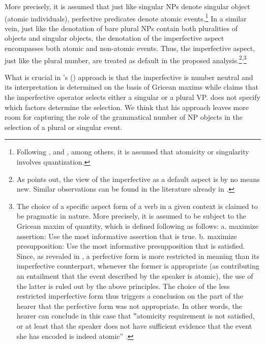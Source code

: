 \documentclass[output=paper]{langscibook}
\begin{document}
\noindent More precisely, it is assumed that just like singular NPs denote singular object (atomic individuals), perfective predicates denote atomic events.\footnote{Following \citet{Krifka1992}, \citet{Filip2000} and \citet{Rothstein2004}, among others, it is assumed that atomicity or singularity involves quantization.} In a similar vein, just like the denotation of bare plural NPs contain both pluralities of objects and singular objects, the denotation of the imperfective aspect encompasses both atomic and non-atomic events. Thus, the imperfective aspect, just like the plural number, are treated as default in the proposed analysis.\footnote{As \citet{Kagan2010} points out, the view of the imperfective as a default aspect is by no means new. Similar observations can be found in the literature already in  \citet{Forsyth1970}.}\textsuperscript{,}\footnote{The choice of a specific aspect form of a verb in a given context is claimed to be pragmatic in nature. More precisely, it is assumed to be subject to the Gricean maxim of quantity, which \citet{Kagan2008, Kagan2010} is defined following \citet{Sauerland2003b} as follows:	a.	maximize assertion: Use the most informative assertion that is true. b.	maximize presupposition: Use the most informative presupposition that is satisfied.   
Since, as revealed in , a perfective form is more restricted in meaning than its imperfective counterpart, whenever the former is appropriate (as contributing an entailment that the event described by the speaker is atomic), the use of the latter is ruled out by the above principles. The choice of the less restricted imperfective form thus triggers a conclusion on the part of the hearer that the perfective form was not appropriate. In other words, the hearer can conclude in this case that ‟atomicity requirement is not satisfied, or at least that the speaker does not have sufficient evidence that the event she has encoded is indeed atomic” \citep[10--12]{Kagan2008}.}
 
What is crucial in \citeauthor{Kagan2008}'s (\citeyear{Kagan2008, Kagan2010}) approach is that the imperfective is number neutral and its interpretation is determined on the basis of Gricean maxims while \citet{Ferreira2004, Ferreira2005} claims that the imperfective operator selects either a singular or a plural VP. \citet{Ferreira2004, Ferreira2005} does not specify which factors determine the selection. We think that his approach leaves more room for capturing the role of the grammatical number of NP objects in the selection of a plural or singular event.  
\end{document}
